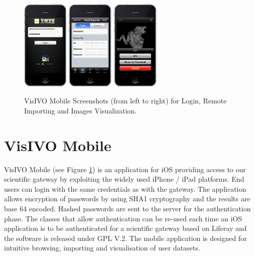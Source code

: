 \documentclass[11pt,twoside]{article}
\begin{document}
\begin{figure}
    \centering
    \includegraphics[width=0.2\textwidth]{O08_f3.eps}
    \includegraphics[width=0.2\textwidth]{O08_f4.eps}
    \includegraphics[width=0.2\textwidth]{O08_f5.eps}
    \caption{VisIVO Mobile Screenshots (from left to right) for Login, Remote Importing and Images Visualization.}
\label{fig:visivomobile}
\end{figure}

\section{VisIVO Mobile}
VisIVO Mobile  (see Figure \ref{fig:visivomobile}) is an application for iOS providing access to our scientific gateway by exploiting the widely used iPhone / iPad platforms. End users can login with the same credentials as with the gateway. The application allows encryption of passwords by using SHA1 cryptography and the results are base 64 encoded. Hashed passwords are sent to the server for the authentication phase. The classes that allow authentication can be re-used each time an iOS application is to be authenticated for a scientific gateway based on Liferay  and the software is released under GPL V.2. The mobile application is designed for intuitive browsing, importing and visualisation of user datasets.
\end{document}
